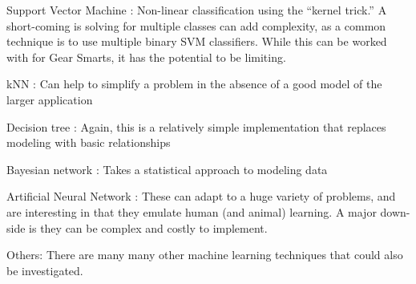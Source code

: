 \begin{description}
  \item{Support Vector Machine \cite{SVM}:} Non-linear classification using the ``kernel trick.'' A short-coming is solving for multiple
  classes can add complexity, as a common technique is to use multiple binary SVM classifiers. While this can be worked with
  for Gear Smarts, it has the potential to be limiting.
  \item{kNN \cite{KNN}:} Can help to simplify a problem in the absence of a good model of the larger application
  \item{Decision tree \cite{DecisionTree}:} Again, this is a relatively simple implementation that replaces modeling with basic relationships
  \item{Bayesian network \cite{BayesianNetwork}:} Takes a statistical approach to modeling data
  \item{Artificial Neural Network \cite{ANN}:} These can adapt to a huge variety of problems, and are interesting in that they emulate
  human (and animal) learning. A major down-side is they can be complex and costly to implement.
  \item{Others:} There are many many other machine learning techniques that could also be investigated.
\end{description}